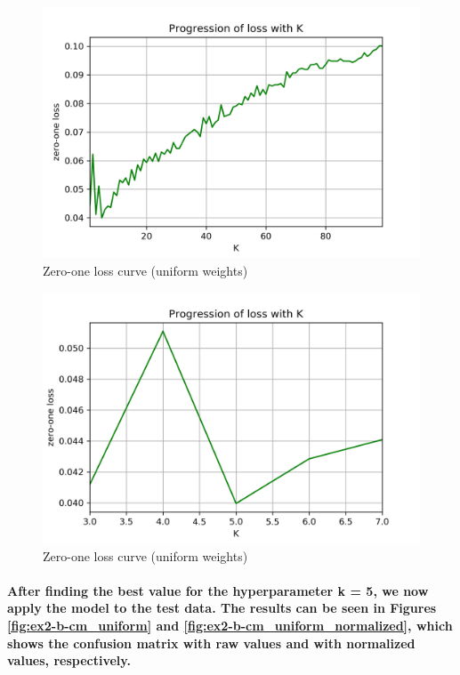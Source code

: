 \documentclass[a4paper]{article}    %
\begin{document}
\begin{figure}[H]
    \centering
    \includegraphics[width=12cm]{error_uniform}
    \caption{Zero-one loss curve (uniform weights)}
    \label{fig:ex2-b-error_uniform}
\end{figure}

\begin{figure}[H]
    \centering
    \includegraphics[width=12cm]{error_uniform_(zoom)}
    \caption{Zero-one loss curve (uniform weights)}
    \label{fig:ex2-b-error_uniform_zoom}
\end{figure}

\paragraph{After finding the best value for the hyperparameter k = 5, we now apply the model to the test data. The results can be seen in Figures \ref{fig:ex2-b-cm_uniform} and \ref{fig:ex2-b-cm_uniform_normalized}, which shows the confusion matrix with raw values and with normalized values, respectively.}
\end{document}
